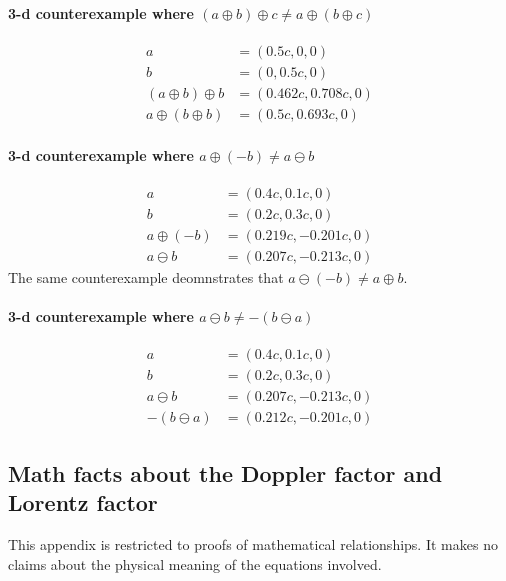 \documentclass[a4paper]{article}
\theoremstyle{plain}
\theoremstyle{definition}
\begin{document}
\paragraph{3-d counterexample where $(a \oplus b) \oplus c \neq a \oplus (b \oplus c)$}
\begin{align*}
  a & = (0.5c, 0, 0) \\
  b & = (0, 0.5c, 0) \\
  (a \oplus b) \oplus b & = (0.462c, 0.708c, 0) \\
  a \oplus (b \oplus b) & = (0.5c, 0.693c, 0)
\end{align*}

\paragraph{3-d counterexample where $a \oplus (-b) \neq a \ominus b$}
\begin{align*}
  a & = (0.4c, 0.1c, 0) \\
  b & = (0.2c, 0.3c, 0) \\
  a \oplus (-b) & = (0.219c, -0.201c, 0) \\
  a \ominus b & = (0.207c, -0.213c, 0)
\end{align*}
The same counterexample deomnstrates that
$a \ominus (-b) \neq a \oplus b$.

\paragraph{3-d counterexample where $a \ominus b \neq - (b \ominus a)$}
\begin{align*}
  a & = (0.4c, 0.1c, 0) \\
  b & = (0.2c, 0.3c, 0) \\
  a \ominus b & = (0.207c, -0.213c, 0) \\
  -(b \ominus a) & = (0.212c, -0.201c, 0)
\end{align*}


\subsection{Math facts about the Doppler factor and Lorentz factor}
\label{app:DopplerFactor}

This appendix is restricted to proofs of mathematical relationships.
It makes no claims about the physical meaning of the equations
involved.
\end{document}
